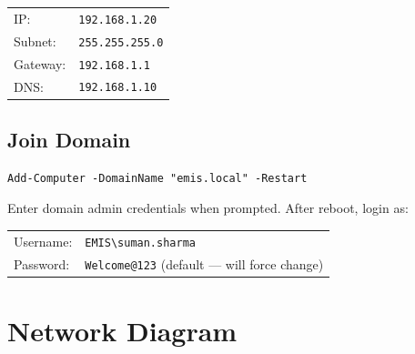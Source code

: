 ﻿\documentclass[12pt,a4paper]{article}
\begin{document}
\begin{cmdbox}
\begin{tabular}{ll}
IP:      & \texttt{192.168.1.20} \\
Subnet:  & \texttt{255.255.255.0} \\
Gateway: & \texttt{192.168.1.1} \\
DNS:     & \texttt{192.168.1.10} \\
\end{tabular}
\end{cmdbox}

\subsection{Join Domain}

\begin{lstlisting}
Add-Computer -DomainName "emis.local" -Restart
\end{lstlisting}

Enter domain admin credentials when prompted. After reboot, login as:

\begin{cmdbox}
\begin{tabular}{ll}
Username: & \texttt{EMIS\textbackslash suman.sharma} \\
Password: & \texttt{Welcome@123} (default --- will force change) \\
\end{tabular}
\end{cmdbox}

\section{Network Diagram}
\end{document}

